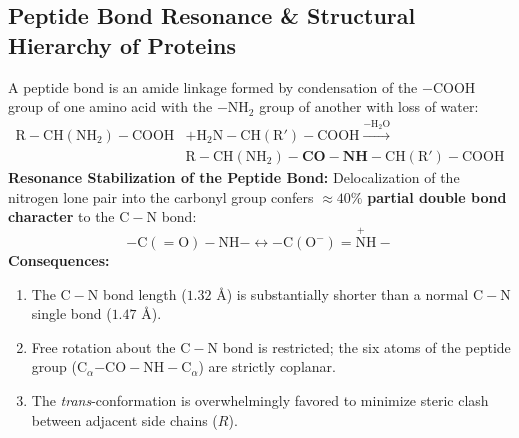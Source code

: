 \documentclass[10pt,twoside,openright]{book}
\begin{document}
\subsection{Peptide Bond Resonance \& Structural Hierarchy of Proteins}

\begin{conceptbox}
A peptide bond is an amide linkage formed by condensation of the $-\mathrm{COOH}$ group of one amino acid with the $-\mathrm{NH_2}$ group of another with loss of water:
\begin{align}
  \mathrm{R-CH(NH_2)-COOH} &+ \mathrm{H_2N-CH(R')-COOH} \xrightarrow{-\mathrm{H_2O}} \\
  &\mathrm{R-CH(NH_2)-\mathbf{CO-NH}-CH(R')-COOH}
\end{align}
\textbf{Resonance Stabilization of the Peptide Bond:}
Delocalization of the nitrogen lone pair into the carbonyl group confers $\approx 40\%$ \textbf{partial double bond character} to the $\mathrm{C-N}$ bond:
\begin{equation}
  -\mathrm{C(=O)-NH}- \longleftrightarrow -\mathrm{C(O^-)=\overset{+}{N}H}-
\end{equation}
\textbf{Consequences:}
\begin{enumerate}
  \item The $\mathrm{C-N}$ bond length ($1.32\text{ \AA}$) is substantially shorter than a normal $\mathrm{C-N}$ single bond ($1.47\text{ \AA}$).
  \item Free rotation about the $\mathrm{C-N}$ bond is restricted; the six atoms of the peptide group ($\mathrm{C}_\alpha\mathrm{-CO-NH-C}_\alpha$) are strictly coplanar.
  \item The \textit{trans}-conformation is overwhelmingly favored to minimize steric clash between adjacent side chains ($R$).
\end{enumerate}
\end{conceptbox}
\end{document}
